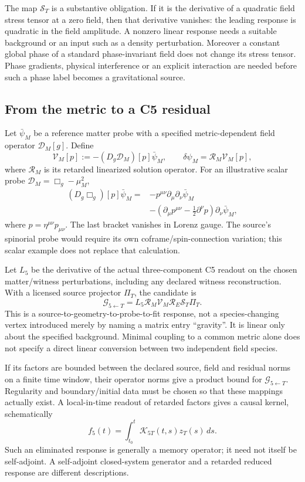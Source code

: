 \documentclass[11pt,a4paper]{article}
\begin{document}
The map $\mathcal S_T$ is a substantive obligation. If it is the
derivative of a quadratic field stress tensor at a zero field,
then that derivative vanishes: the leading response is quadratic
in the field amplitude. A nonzero linear response needs a suitable
background or an input such as a density perturbation. Moreover a
constant global phase of a standard phase-invariant field does not
change its stress tensor. Phase gradients, physical interference or
an explicit interaction are needed before such a phase label becomes
a gravitational source.

\subsection{From the metric to a C5 residual}
Let $\bar\psi_M$ be a reference matter probe with a specified
metric-dependent field operator $\mathcal D_M[g]$. Define
\[
 \mathcal V_M[p]
 :=-(D_g\mathcal D_M)[p]\bar\psi_M,
 \qquad \delta\psi_M
 =\mathcal R_M\mathcal V_M[p],
\]
where $\mathcal R_M$ is its retarded linearized solution operator.
For an illustrative scalar probe
$\mathcal D_M=\Box_g-\mu_M^2$,
\[
 \begin{aligned}
 (D_g\Box_g)[p]\bar\psi_M
 ={}&-p^{\mu\nu}\partial_\mu\partial_\nu\bar\psi_M\\
 &-\left(\partial_\mu p^{\mu\nu}
 -\tfrac12\partial^\nu p\right)\partial_\nu\bar\psi_M,
 \end{aligned}
\]
where $p=\eta^{\mu\nu}p_{\mu\nu}$. The last bracket vanishes
in Lorenz gauge. The source's spinorial probe would require its
own coframe/spin-connection variation; this scalar example does
not replace that calculation.

Let $L_5$ be the derivative of the actual three-component C5 readout
on the chosen matter/witness perturbations, including any declared
witness reconstruction. With a licensed source projector $\Pi_T$,
the candidate is
\[
 \boxed{\mathcal G_{5\leftarrow T}
 =L_5\mathcal R_M\mathcal V_M\mathcal R_E
 \mathcal S_T\Pi_T.}
\]
This is a source-to-geometry-to-probe-to-fit response, not a
species-changing vertex introduced merely by naming a matrix entry
``gravity''. It is linear only about the specified background.
Minimal coupling to a common metric alone does not specify a direct
linear conversion between two independent field species.

If its factors are bounded between the declared source, field and
residual norms on a finite time window, their operator norms give
a product bound for $\mathcal G_{5\leftarrow T}$. Regularity and
boundary/initial data must be chosen so that these mappings actually
exist. A local-in-time readout of retarded factors gives a causal
kernel, schematically
\[
 f_5(t)=\int_{t_0}^t\mathcal K_{5T}(t,s)z_T(s)\,ds.
\]
Such an eliminated response is generally a memory operator; it need
not itself be self-adjoint. A self-adjoint closed-system generator
and a retarded reduced response are different descriptions.
\end{document}
